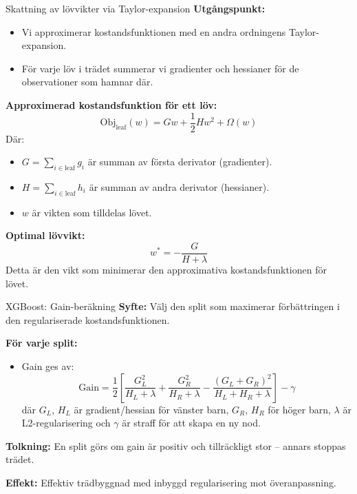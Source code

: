 \documentclass[10pt,english]{beamer}
\begin{document}
\begin{frame}{Skattning av lövvikter via Taylor-expansion}
  \textbf{Utgångspunkt:}
  \begin{itemize}
    \item Vi approximerar kostandsfunktionen med en andra ordningens Taylor-expansion.
    \item För varje löv i trädet summerar vi gradienter och hessianer för de observationer som hamnar där.
  \end{itemize}

  \textbf{Approximerad kostandsfunktion för ett löv:}
  \begin{equation*}
    \text{Obj}_{\text{leaf}}(w) = G w + \frac{1}{2} H w^2 + \Omega(w)
  \end{equation*}
  Där:
  \begin{itemize}
    \item \( G = \sum_{i \in \text{leaf}} g_i \) är summan av första derivator (gradienter).
    \item \( H = \sum_{i \in \text{leaf}} h_i \) är summan av andra derivator (hessianer).
    \item \( w \) är vikten som tilldelas lövet.
  \end{itemize}

  \textbf{Optimal lövvikt:}
  \begin{equation*}
    w^* = -\frac{G}{H + \lambda}
  \end{equation*}
  Detta är den vikt som minimerar den approximativa kostandsfunktionen för lövet.
\end{frame}



\begin{frame}{XGBoost: Gain-beräkning}
  \textbf{Syfte:} Välj den split som maximerar förbättringen i den regulariserade kostandsfunktionen.

  \textbf{För varje split:}
  \begin{itemize}
    \item Gain ges av:
    \[
      \text{Gain} = \frac{1}{2} \left[ \frac{G_L^2}{H_L + \lambda} + \frac{G_R^2}{H_R + \lambda} - \frac{(G_L + G_R)^2}{H_L + H_R + \lambda} \right] - \gamma
    \]
    där $G_L$, $H_L$ är gradient/hessian för vänster barn, $G_R$, $H_R$ för höger barn, $\lambda$ är L2-regularisering och $\gamma$ är straff för att skapa en ny nod.
  \end{itemize}

  \textbf{Tolkning:} En split görs om gain är positiv och tillräckligt stor – annars stoppas trädet.

  \textbf{Effekt:} Effektiv trädbyggnad med inbyggd regularisering mot överanpassning.
\end{frame}
\end{document}
